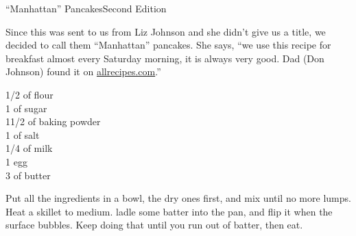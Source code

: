 \begin{entry}{``Manhattan'' Pancakes}{Second Edition}

\begin{open}
  Since this was sent to us from Liz Johnson and she didn't give us a
  title, we decided to call them ``Manhattan'' pancakes. She says, ``we use
  this recipe for breakfast almost every Saturday morning, it is always very
  good. Dad (Don Johnson) found it on \url{allrecipes.com}.''
\end{open}
\begin{ingredients}
    \SI{1/2}{\cup} of flour\\
    \SI{1}{\tblspoon} of sugar\\
    1\SI{1/2}{\teaspoon} of baking powder\\
    \SI{1}{\teaspoon} of salt\\
    \SI{1/4}{\cup} of milk\\
    1 egg\\
    \SI{3}{\tblspoon} of butter
\end{ingredients}
Put all the ingredients in a bowl, the dry ones first, and mix until no more
lumps. Heat a skillet to medium. ladle some batter into the pan, and flip it
when the surface bubbles. Keep doing that until you run out of batter, then
eat.
\end{entry}

